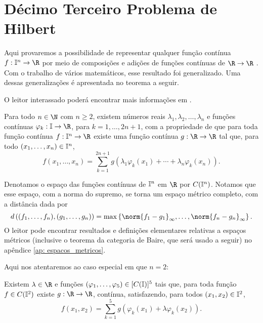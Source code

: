 \section{Décimo Terceiro Problema de Hilbert}

Aqui provaremos a possibilidade de representar qualquer função contínua \( f : \I^{ n } \to \R \) por meio de composições e adições de funções contínuas de \( \R \to \R \) .
Com o trabalho de vários matemáticos, esse resultado foi generalizado.
Uma dessas generalizações é apresentada no teorema a seguir.

O leitor interassado poderá encontrar mais informações em \cite{hilbert}.
\begin{teo}
    Para todo \( n \in \N \) com \( n \geq 2 \), existem números reais \( \lambda_{ 1 }, \lambda_{ 2 }, \dots, \lambda_{ n } \) e funções contínuas \( \varphi_{ k } : \I \to \R \), para \( k = 1, \dots, 2n + 1 \), com a propriedade de que para toda função contínua \( f : \I^{ n } \to \R \) existe uma função contínua \( g : \R \to \R \) tal que, para todo \( ( x_{ 1 }, \dots, x_{ n } ) \in \mathbb{I}^{ n } \),
    \begin{equation}
        f(x_{ 1 }, \dots, x_{ n }) =
        \sum_{ k=1 }^{ 2n+1 } g ( \lambda_{ 1 } \varphi_{ k } ( x_{ 1 } )  + \cdots + \lambda_{ n } \varphi_{ k } ( x_{ n } ) )
        \label{eq: kolmogorov_2}
    .\end{equation}
\end{teo}
\begin{rem}
    Denotamos o espaço das funções contínuas de \( \mathbb{I}^{ n } \) em \( \R \) por \( C(\mathbb{I}^{ n }) \).
    Notamos que esse espaço, com a norma do supremo, se torna um espaço métrico completo, com a distância dada por
    \begin{equation}
        d \left( 
            ( f_{ 1 }, \dots, f_{ n } ),
            ( g_{ 1 }, \dots, g_{ n } )
        \right)
        = \max \left\{ 
            \norm{ f_{ 1 } - g_{ 1 } }_{ \infty },
            \dots,
            \norm{ f_{ n } - g_{ n } }_{ \infty }
        \right\}
    .\end{equation}
    O leitor pode encontrar resultados e definições elementares relativas a espaços métricos (inclusive o teorema da categoria de Baire, que será usado a seguir) no apêndice \ref{ap: espacos_metricos}.
\end{rem}
Aqui nos atentaremos ao caso especial em que \( n = 2 \):
\begin{teo}
    Existem \( \lambda \in \R \) e funções \( ( \varphi_{ 1 }, \dots, \varphi_{ 5 } ) \in [C(\mathbb{I})]^{ 5 } \) tais que, para toda função \( f \in C(\mathbb{I}^{ 2 }) \) existe \( g : \R \to \R \), contínua, satisfazendo, para todos \( ( x_{ 1 }, x_{ 2 } ) \in \mathbb{I}^{ 2 } \), \[
        f ( x_{ 1 }, x_{ 2 } ) =
        \sum_{ k=1 }^{ 5 } g ( \varphi_{ k } ( x_{ 1 } ) + \lambda \varphi_{ k } ( x_{ 2 } ) )
    .\]
    \label{teo: hilbert13}
\end{teo}
